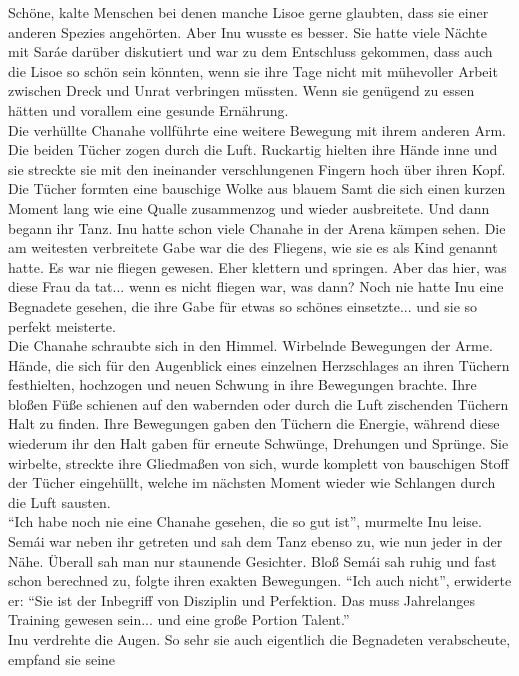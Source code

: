 Schöne, kalte Menschen bei denen manche Lisoe gerne glaubten, dass sie einer anderen Spezies 
angehörten. Aber Inu wusste es besser. Sie hatte viele Nächte mit Saráe darüber diskutiert und war 
zu dem Entschluss gekommen, dass auch die Lisoe so schön sein könnten, wenn sie ihre Tage nicht mit 
mühevoller Arbeit zwischen Dreck und Unrat verbringen müssten. Wenn sie genügend zu essen hätten 
und vorallem eine gesunde Ernährung. \\
Die verhüllte Chanahe vollführte eine weitere Bewegung mit ihrem anderen Arm. Die beiden Tücher 
zogen durch die Luft. Ruckartig hielten ihre Hände inne und sie streckte sie mit den ineinander 
verschlungenen Fingern hoch über ihren Kopf. Die Tücher formten eine bauschige Wolke aus blauem 
Samt die sich einen kurzen Moment lang wie eine Qualle zusammenzog und wieder ausbreitete. Und dann 
begann ihr Tanz. Inu hatte schon viele Chanahe in der Arena kämpen sehen. Die am weitesten 
verbreitete Gabe war die des Fliegens, wie sie es als Kind genannt hatte. Es war nie fliegen 
gewesen. Eher klettern und springen. Aber das hier, was diese Frau da tat... wenn es nicht fliegen 
war, was dann? Noch nie hatte Inu eine Begnadete gesehen, die ihre Gabe für etwas so schönes 
einsetzte... und sie so perfekt meisterte. \\
Die Chanahe schraubte sich in den Himmel. Wirbelnde Bewegungen der Arme. Hände, die sich für den 
Augenblick eines einzelnen Herzschlages an ihren Tüchern festhielten, hochzogen und neuen Schwung 
in ihre Bewegungen brachte. Ihre bloßen Füße schienen auf den wabernden oder durch die Luft 
zischenden Tüchern Halt zu finden. Ihre Bewegungen gaben den Tüchern die Energie, während diese 
wiederum ihr den Halt gaben für erneute Schwünge, Drehungen und Sprünge. Sie wirbelte, streckte 
ihre Gliedmaßen von sich, wurde komplett von bauschigen Stoff der Tücher eingehüllt, welche im 
nächsten Moment wieder wie Schlangen durch die Luft sausten.\\
``Ich habe noch nie eine Chanahe gesehen, die so gut ist'', murmelte Inu leise.\\
Semái war neben ihr getreten und sah dem Tanz ebenso zu, wie nun jeder in der Nähe. Überall sah man 
nur staunende Gesichter. Bloß Semái sah ruhig und fast schon berechned zu, folgte ihren exakten 
Bewegungen. ``Ich auch nicht'', erwiderte er: ``Sie ist der Inbegriff von Disziplin und Perfektion. 
Das muss Jahrelanges Training gewesen sein... und eine große Portion Talent.''\\
Inu verdrehte die Augen. So sehr sie auch eigentlich die Begnadeten verabscheute, empfand sie seine 
